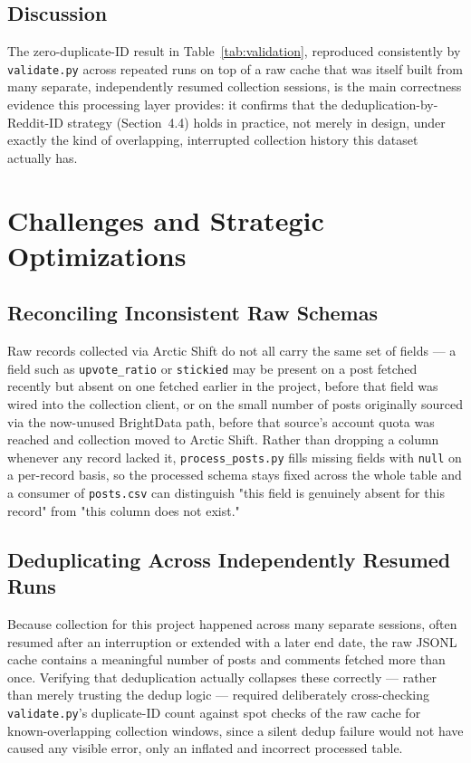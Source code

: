 \documentclass[12pt]{article}
\begin{document}
\subsection{Discussion}
The zero-duplicate-ID result in Table~\ref{tab:validation}, reproduced consistently by
\texttt{validate.py} across repeated runs on top of a raw cache that was itself built from many
separate, independently resumed collection sessions, is the main correctness evidence this
processing layer provides: it confirms that the deduplication-by-Reddit-ID strategy
(Section~4.4) holds in practice, not merely in design, under exactly the kind of overlapping,
interrupted collection history this dataset actually has.


\section{Challenges and Strategic Optimizations}

\subsection{Reconciling Inconsistent Raw Schemas}
Raw records collected via Arctic Shift do not all carry the same set of fields — a field such as
\texttt{upvote\_ratio} or \texttt{stickied} may be present on a post fetched recently but absent
on one fetched earlier in the project, before that field was wired into the collection client, or
on the small number of posts originally sourced via the now-unused BrightData path, before that
source's account quota was reached and collection moved to Arctic Shift. Rather than
dropping a column whenever any record lacked it, \texttt{process\_posts.py} fills missing fields
with \texttt{null} on a per-record basis, so the processed schema stays fixed across the whole
table and a consumer of \texttt{posts.csv} can distinguish "this field is genuinely absent for
this record" from "this column does not exist."

\subsection{Deduplicating Across Independently Resumed Runs}
Because collection for this project happened across many separate sessions, often resumed after
an interruption or extended with a later end date, the raw JSONL cache contains a meaningful
number of posts and comments fetched more than once. Verifying that deduplication actually
collapses these correctly — rather than merely trusting the dedup logic — required deliberately
cross-checking \texttt{validate.py}'s duplicate-ID count against spot checks of the raw cache for
known-overlapping collection windows, since a silent dedup failure would not have caused any
visible error, only an inflated and incorrect processed table.
\end{document}
